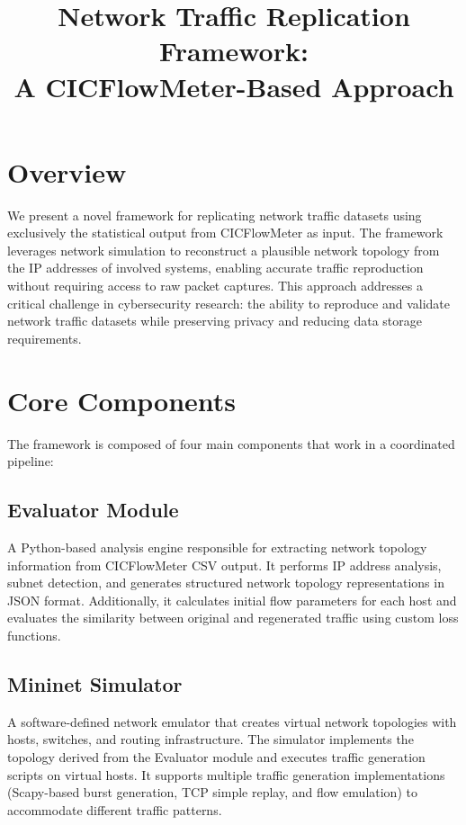 \documentclass[11pt,a4paper]{article}
\title{Network Traffic Replication Framework:\\A CICFlowMeter-Based Approach}
\author{}
\date{}
\begin{document}
\maketitle

\section{Overview}

We present a novel framework for replicating network traffic datasets using exclusively the statistical output from CICFlowMeter as input. The framework leverages network simulation to reconstruct a plausible network topology from the IP addresses of involved systems, enabling accurate traffic reproduction without requiring access to raw packet captures. This approach addresses a critical challenge in cybersecurity research: the ability to reproduce and validate network traffic datasets while preserving privacy and reducing data storage requirements.

\section{Core Components}

The framework is composed of four main components that work in a coordinated pipeline:

\subsection{Evaluator Module}

A Python-based analysis engine responsible for extracting network topology information from CICFlowMeter CSV output. It performs IP address analysis, subnet detection, and generates structured network topology representations in JSON format. Additionally, it calculates initial flow parameters for each host and evaluates the similarity between original and regenerated traffic using custom loss functions.

\subsection{Mininet Simulator}

A software-defined network emulator that creates virtual network topologies with hosts, switches, and routing infrastructure. The simulator implements the topology derived from the Evaluator module and executes traffic generation scripts on virtual hosts. It supports multiple traffic generation implementations (Scapy-based burst generation, TCP simple replay, and flow emulation) to accommodate different traffic patterns.
\end{document}
